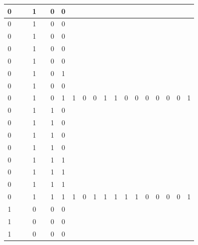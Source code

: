 \begin{table}[!tb]
\begin{tabular}{|c|c|c|c|c|c|c|c|c|c|c|c|c|c|c|c|c|c|c|}
        \rowcolor{red!40} 0 &  &  & 1 &  & 0 & 0 &  &  &  &  &  &  &  &  &  &  &  &  \\ \hline
        \rowcolor{red!40} 0 &  &  & 1 &  & 0 & 0 &  &  &  &  &  &  &  &  &  &  &  &  \\ \hline
        \rowcolor{red!40} 0 &  &  & 1 &  & 0 & 0 &  &  &  &  &  &  &  &  &  &  &  &  \\ \hline
        \rowcolor{red!40} 0 &  &  & 1 &  & 0 & 0 &  &  &  &  &  &  &  &  &  &  &  &  \\ \hline
        \rowcolor{red!40} 0 &  &  & 1 &  & 0 & 0 &  &  &  &  &  &  &  &  &  &  &  &  \\ \hline
        \rowcolor{red!40} 0 &  &  & 1 &  & 0 & 1 &  &  &  &  &  &  &  &  &  &  &  &  \\ \hline
        \rowcolor{red!40} 0 &  &  & 1 &  & 0 & 0 &  &  &  &  &  &  &  &  &  &  &  &  \\ \hline
        \rowcolor{red!40} 0 &  &  & 1 &  & 0 & 1 & 1 & 0 & 0 & 1 & 1 & 0 & 0 & 0 & 0 & 0 & 0 & 1 \\ \hline
        \rowcolor{green!40} 0 &  &  & 1 &  & 1 & 0 &  &  &  &  &  &  &  &  &  &  &  &  \\ \hline
        \rowcolor{green!40} 0 &  &  & 1 &  & 1 & 0 &  &  &  &  &  &  &  &  &  &  &  &  \\ \hline
        \rowcolor{green!40} 0 &  &  & 1 &  & 1 & 0 &  &  &  &  &  &  &  &  &  &  &  &  \\ \hline
        \rowcolor{green!40} 0 &  &  & 1 &  & 1 & 0 &  &  &  &  &  &  &  &  &  &  &  &  \\ \hline
        \rowcolor{green!40} 0 &  &  & 1 &  & 1 & 1 &  &  &  &  &  &  &  &  &  &  &  &  \\ \hline
        \rowcolor{green!40} 0 &  &  & 1 &  & 1 & 1 &  &  &  &  &  &  &  &  &  &  &  &  \\ \hline
        \rowcolor{green!40} 0 &  &  & 1 &  & 1 & 1 &  &  &  &  &  &  &  &  &  &  &  &  \\ \hline
        \rowcolor{green!40} 0 &  &  & 1 &  & 1 & 1 & 1 & 0 & 1 & 1 & 1 & 1 & 1 & 0 & 0 & 0 & 0 & 1 \\ \hline
        \rowcolor{yellow!40} 1 &  &  & 0 &  & 0 & 0 &  &  &  &  &  &  &  &  &  &  &  &  \\ \hline
        \rowcolor{yellow!40} 1 &  &  & 0 &  & 0 & 0 &  &  &  &  &  &  &  &  &  &  &  &  \\ \hline
        \rowcolor{yellow!40} 1 &  &  & 0 &  & 0 & 0 &  &  &  &  &  &  &  &  &  &  &  &  \\ \hline

\end{tabular}
\end{table}
